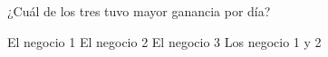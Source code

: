 ¿Cuál de los tres tuvo mayor ganancia por día?

\begin{choices}
    \choice El negocio 1
    \choice El negocio 2
    \CorrectChoice El negocio 3
    \choice Los negocio 1 y 2
\end{choices}